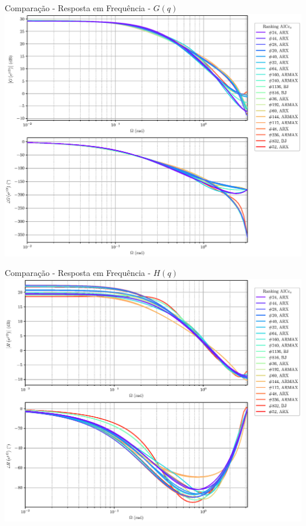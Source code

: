 \documentclass{beamer}
\begin{document}
\begin{frame}{Comparação - Resposta em Frequência - $G(q)$}
  \centering
  \includegraphics[width=.9\linewidth]{bode_G_AICCv}
\end{frame}

\begin{frame}{Comparação - Resposta em Frequência - $H(q)$}
  \centering
  \includegraphics[width=.9\linewidth]{bode_H_AICCv}
\end{frame}
\end{document}
